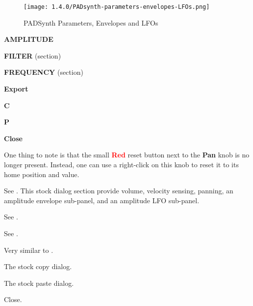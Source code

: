 \begin{figure}[H]
   \centering 
   \texttt{[image: 1.4.0/PADsynth-parameters-envelopes-LFOs.png]}
   \caption{PADSynth Parameters, Envelopes and LFOs}
   \label{fig:padsynth_parameters_envelopes_and_lfos}
\end{figure}

   \begin{enumber}
      \item \textbf{AMPLITUDE}
      \item \textbf{FILTER} (section)
      \item \textbf{FREQUENCY} (section)
      \item \textbf{Export}
      \item \textbf{C}
      \item \textbf{P}
      \item \textbf{Close}
   \end{enumber}

   One thing to note is that the small \textbf{\textcolor{red}{Red}}
   reset button next to the \textbf{Pan} knob is no longer present.  Instead,
   one can use a right-click on this knob to reset it to its home position and
   value.

   See .
   This stock dialog section provide volume, velocity sensing, panning, an
   amplitude envelope sub-panel, and an amplitude LFO sub-panel.

   See .

   See .

   Very similar to 
   .

   The stock copy dialog.

   The stock paste dialog.

   Close.

